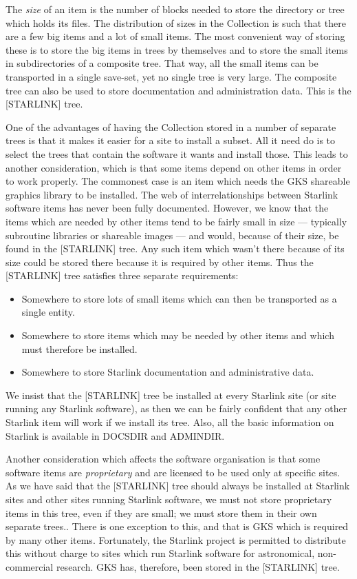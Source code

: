 The {\em size} of an item is the number of blocks needed to store the directory
or tree which holds its files.
The distribution of sizes in the Collection is such that there are a few big
items and a lot of small items.
The most convenient way of storing these is to store the big items in trees by
themselves and to store the small items in subdirectories of a composite tree.
That way, all the small items can be transported in a single save-set, yet no
single tree is very large.
The composite tree can also be used to store documentation and administration
data.
This is the [STARLINK] tree.

One of the advantages of having the Collection stored in a number of separate
trees is that it makes it easier for a site to install a subset.
All it need do is to select the trees that contain the software it wants and
install those.
This leads to another consideration, which is that some items depend on other
items in order to work properly.
The commonest case is an item which needs the GKS shareable graphics library
to be installed.
The web of interrelationships between Starlink software items has never been
fully documented.
However, we know that the items which are needed by other items tend to be
fairly small in size --- typically subroutine libraries or shareable images ---
and would, because of their size, be found in the [STARLINK] tree.
Any such item which wasn't there because of its size could be stored there
because it is required by other items.
Thus the [STARLINK] tree satisfies three separate requirements:
\begin{itemize}
\item Somewhere to store lots of small items which can then be transported as
a single entity.
\item Somewhere to store items which may be needed by other items and which must
therefore be installed.
\item Somewhere to store Starlink documentation and administrative data.
\end{itemize}
We insist that the [STARLINK] tree be installed at every Starlink site
(or site running any Starlink software), as then we can be fairly confident
that any other Starlink item will work if we install its tree.
Also, all the basic information on Starlink is available in DOCSDIR and
ADMINDIR.

Another consideration which affects the software organisation is that some
software items are {\em proprietary} and are licensed to be used only at
specific sites.
As we have said that the [STARLINK] tree should always be installed at
Starlink sites and other sites running Starlink software, we must not store
proprietary items in this tree, even if they are small; we must store them in
their own separate trees..
There is one exception to this, and that is GKS which is required by many other
items.
Fortunately, the Starlink project is permitted to distribute this without
charge to sites which run Starlink software for astronomical, non-commercial
research.
GKS has, therefore, been stored in the [STARLINK] tree.


